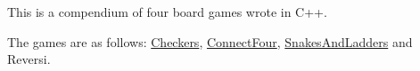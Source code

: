 This is a compendium of four board games wrote in C++.

The games are as follows\-: \hyperlink{classCheckers}{Checkers}, \hyperlink{classConnectFour}{Connect\-Four}, \hyperlink{classSnakesAndLadders}{Snakes\-And\-Ladders} and Reversi. 